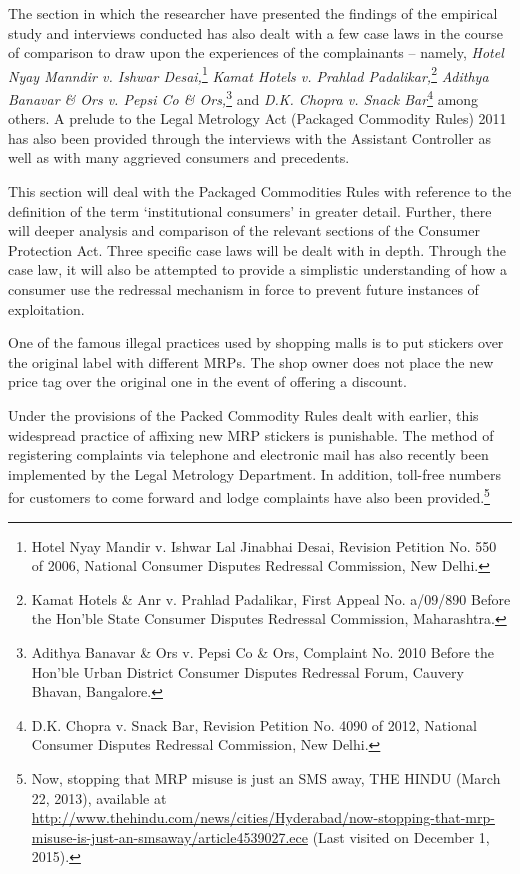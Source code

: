 \begin{multicols}{2}
\noi
The section in which the researcher have presented the findings of the empirical study and
interviews conducted has also dealt with a few case laws in the course of comparison to draw
upon the experiences of the complainants – namely, \textit{Hotel Nyay Manndir v. Ishwar Desai,}\footnote{Hotel Nyay Mandir v. Ishwar Lal Jinabhai Desai, Revision Petition No. 550 of 2006, National Consumer Disputes Redressal Commission, New Delhi.} \textit{Kamat Hotels v. Prahlad Padalikar,}\footnote{Kamat Hotels \& Anr v. Prahlad Padalikar, First Appeal No. a/09/890 Before the Hon’ble State Consumer Disputes Redressal Commission, Maharashtra.} \textit{Adithya Banavar \& Ors v. Pepsi Co \& Ors,}\footnote{Adithya Banavar \& Ors v. Pepsi Co \& Ors, Complaint No. 2010 Before the Hon’ble Urban District Consumer Disputes Redressal Forum, Cauvery Bhavan, Bangalore.} and \textit{D.K. Chopra v. Snack Bar}\footnote{D.K. Chopra v. Snack Bar, Revision Petition No. 4090 of 2012, National Consumer Disputes Redressal Commission, New Delhi.} among others. A prelude to the Legal Metrology Act (Packaged Commodity Rules) 2011 has also been provided through the interviews with the Assistant Controller as well as with many aggrieved consumers and precedents.

\noi
This section will deal with the Packaged Commodities Rules with reference to the definition
of the term ‘institutional consumers’ in greater detail. Further, there will deeper analysis and
comparison of the relevant sections of the Consumer Protection Act. Three specific case laws
will be dealt with in depth. Through the case law, it will also be attempted to provide a
simplistic understanding of how a consumer use the redressal mechanism in force to prevent
future instances of exploitation.

\noi
One of the famous illegal practices used by shopping malls is to put stickers over the original
label with different MRPs. The shop owner does not place the new price tag over the original
one in the event of offering a discount.

\noi
Under the provisions of the Packed Commodity Rules dealt with earlier, this widespread
practice of affixing new MRP stickers is punishable. The method of registering complaints via
telephone and electronic mail has also recently been implemented by the Legal Metrology
Department. In addition, toll-free numbers for customers to come forward and lodge
complaints have also been provided.\footnote{Now, stopping that MRP misuse is just an SMS away, THE HINDU (March 22, 2013), available at  \url{http://www.thehindu.com/news/cities/Hyderabad/now-stopping-that-mrp-misuse-is-just-an-smsaway/article4539027.ece} (Last visited on December 1, 2015).}


\end{multicols}
